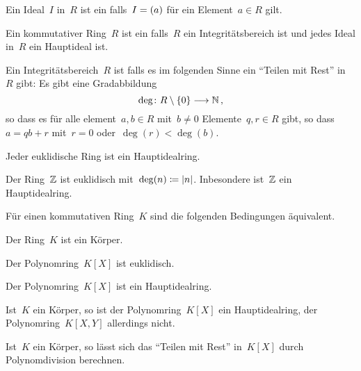 \begin{definition}
  Ein Ideal~$I$ in~$R$ ist ein  falls~$I = (a)$ für ein Element~$a \in R$ gilt.
\end{definition}

\begin{definition}
  Ein kommutativer Ring~$R$ ist ein  falls~$R$ ein Integritätsbereich ist und jedes Ideal in~$R$ ein Hauptideal ist.
\end{definition}

\begin{definition}
  Ein Integritätsbereich~$R$ ist  falls es im folgenden Sinne ein \enquote{Teilen mit Rest} in~$R$ gibt:
  Es gibt eine Gradabbildung
  \[
    \deg
    \colon
    R \setminus \{ 0 \}
    \to
    \Natural \,,
  \]
  so dass es für alle element~$a, b \in R$ mit~$b \neq 0$ Elemente~$q, r \in R$ gibt, so dass~$a = qb + r$ mit~$r = 0$ oder~$\deg(r) < \deg(b)$.
\end{definition}

\begin{proposition}
  Jeder euklidische Ring ist ein Hauptidealring.
\end{proposition}

\begin{example}
  Der Ring~$\mathbb{Z}$ ist euklidisch mit~$\deg(n) \coloneqq \lvert n\rvert$.
  Inbesondere ist~$\mathbb{Z}$ ein Hauptidealring.
\end{example}

\begin{proposition}
  Für einen kommutativen Ring~$K$ sind die folgenden Bedingungen äquivalent.
  \begin{equivlist}
    \item
      Der Ring~$K$ ist ein Körper.
    \item
      Der Polynomring~$K[X]$ ist euklidisch.
    \item
      Der Polynomring~$K[X]$ ist ein Hauptidealring.
  \end{equivlist}
\end{proposition}

\begin{example}
  Ist~$K$ ein Körper, so ist der Polynomring~$K[X]$ ein Hauptidealring, der Polynomring~$K[X,Y]$ allerdings nicht.
\end{example}

\begin{remark}
  Ist~$K$ ein Körper, so lässt sich das \enquote{Teilen mit Rest} in~$K[X]$ durch Polynomdivision berechnen.
\end{remark}

